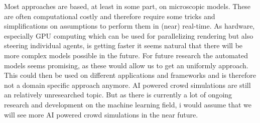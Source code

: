 \documentclass{acmsiggraph}               %
\begin{document}
Most approaches are based, at least in some part, on microscopic models. These are often computational costly and therefore require some tricks and simplifications on assumptions to perform them in (near) real-time. As hardware, especially GPU computing which can be used for parallelizing rendering but also steering individual agents, is getting faster it seems natural that there will be more complex models possible in the future.
For future research the automated models seems promising, as these would allow us to get an uniformly approach. This could then be used on different applications and frameworks and is therefore not a domain specific approach anymore. 
AI powered crowd simulations are still an relatively unresearched topic. But as there is currently a lot of ongoing research and development on the machine learning field, i would assume that we will see more AI powered crowd simulations in the near future.   


\nocite{*}

\end{document}
